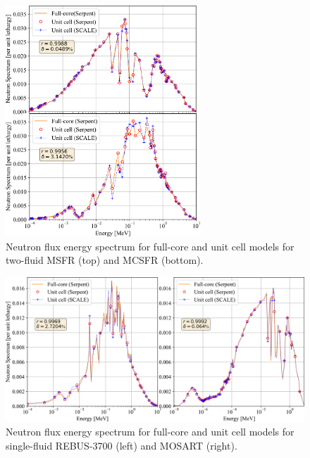 \documentclass[letterpaper]{mandc2019}
\begin{document}
\begin{figure}[t!]
  \centering
  \includegraphics[width=0.65\textwidth]{./Figures/two_full_vs_unit_spectrum.png}
   \vspace{-0.05in}
  \caption{Neutron flux energy spectrum for full-core and unit cell models for two-fluid \gls{MSFR} (top) and \gls{MCSFR} (bottom).}
  \label{fig:spectrum_two}
\end{figure}
\begin{figure}[t!]
  \centering
  \includegraphics[width=\textwidth]{./Figures/rebus_mosart_spectrum.png}
  	  \vspace{-0.2in}
  \caption{Neutron flux energy spectrum for full-core and unit cell models for single-fluid REBUS-3700 (left) and \gls{MOSART} (right).}
  \label{fig:spectrum_rebus}
\end{figure}
\end{document}

